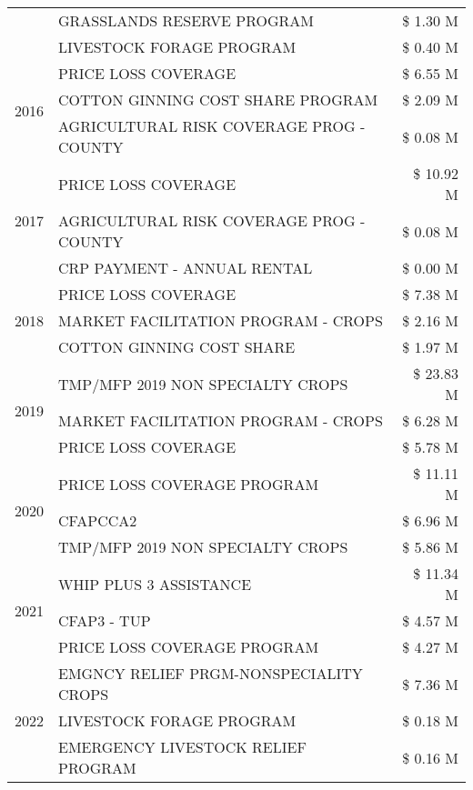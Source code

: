 \begin{tabular}{llr}
 & GRASSLANDS RESERVE PROGRAM & \$ 1.30 M \\
 & LIVESTOCK FORAGE PROGRAM & \$ 0.40 M \\
\cline{1-3}
\multirow[t]{3}{*}{2016} & PRICE LOSS COVERAGE & \$ 6.55 M \\
 & COTTON GINNING COST SHARE PROGRAM & \$ 2.09 M \\
 & AGRICULTURAL RISK COVERAGE PROG - COUNTY & \$ 0.08 M \\
\cline{1-3}
\multirow[t]{3}{*}{2017} & PRICE LOSS COVERAGE & \$ 10.92 M \\
 & AGRICULTURAL RISK COVERAGE PROG - COUNTY & \$ 0.08 M \\
 & CRP PAYMENT - ANNUAL RENTAL & \$ 0.00 M \\
\cline{1-3}
\multirow[t]{3}{*}{2018} & PRICE LOSS COVERAGE & \$ 7.38 M \\
 & MARKET FACILITATION PROGRAM - CROPS & \$ 2.16 M \\
 & COTTON GINNING COST SHARE & \$ 1.97 M \\
\cline{1-3}
\multirow[t]{3}{*}{2019} & TMP/MFP 2019 NON SPECIALTY CROPS & \$ 23.83 M \\
 & MARKET FACILITATION PROGRAM - CROPS & \$ 6.28 M \\
 & PRICE LOSS COVERAGE & \$ 5.78 M \\
\cline{1-3}
\multirow[t]{3}{*}{2020} & PRICE LOSS COVERAGE PROGRAM & \$ 11.11 M \\
 & CFAPCCA2 & \$ 6.96 M \\
 & TMP/MFP 2019 NON SPECIALTY CROPS & \$ 5.86 M \\
\cline{1-3}
\multirow[t]{3}{*}{2021} & WHIP PLUS 3 ASSISTANCE & \$ 11.34 M \\
 & CFAP3 - TUP & \$ 4.57 M \\
 & PRICE LOSS COVERAGE PROGRAM & \$ 4.27 M \\
\cline{1-3}
\multirow[t]{3}{*}{2022} & EMGNCY RELIEF PRGM-NONSPECIALITY CROPS & \$ 7.36 M \\
 & LIVESTOCK FORAGE PROGRAM & \$ 0.18 M \\
 & EMERGENCY LIVESTOCK RELIEF PROGRAM & \$ 0.16 M \\
\cline{1-3}
\bottomrule
\end{tabular}
